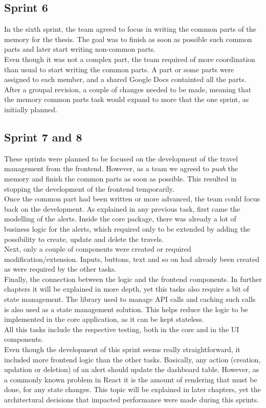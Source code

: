 \documentclass[../memory.tex]{subfiles}
\begin{document}
\subsection{Sprint 6}
In the sixth sprint, the team agreed to focus in writing the common parts of the
memory for the thesis. The goal was to finish as soon as possible such common
parts and later start writing non-common parts.
\\
Even though it was not a complex part, the team required of more coordination
than usual to start writing the common parts. A part or some parts were assigned
to each member, and a shared Google Docs containted all the parts.
\\
After a groupal revision, a couple of changes needed to be made, meaning that
the memory common parts task would expand to more that the one sprint, as
initially planned.
\subsection{Sprint 7 and 8}
These sprints were planned to be focused on the development of the travel
management from the frontend. However, as a team we agreed to \emph{push} the
memory and finish the common parts as soon as possible. This resulted in
stopping the development of the frontend temporarily.
\\[8pt]
Once the common part had been written or more advanced, the team could focus
back on the development. As explained in any previous task, first came the
modelling of the alerts. Inside the core package, there was already a lot of
business logic for the alerts, which required only to be extended by adding the
possibility to create, update and delete the travels.
\\
Next, only a couple of components were created or required
modification/extension. Inputs, buttons, text and so on had already been created
as were required by the other tasks.
\\
Finally, the connection between the logic and the frontend components. In
further chapters it will be explained in more depth, yet this tasks also require
a bit of state management. The library used to manage API calls and caching such
calls is also used as a state management solution. This helps reduce the logic
to be implemented in the core application, as it can be kept stateless.
\\
All this tasks include the respective testing, both in the core and in the UI
components.
\\[8pt]
Even though the development of this sprint seems really straightforward, it
included more frontend logic than the other tasks. Basically, any action
(creation, updation or deletion) of an alert should update the dashboard table.
However, as a commonly known problem in React it is the amount of rendering that
must be done, for any state changes. This topic will be explained in later
chapters, yet the architectural decisions that impacted performance were made
during this sprints.
\end{document}
